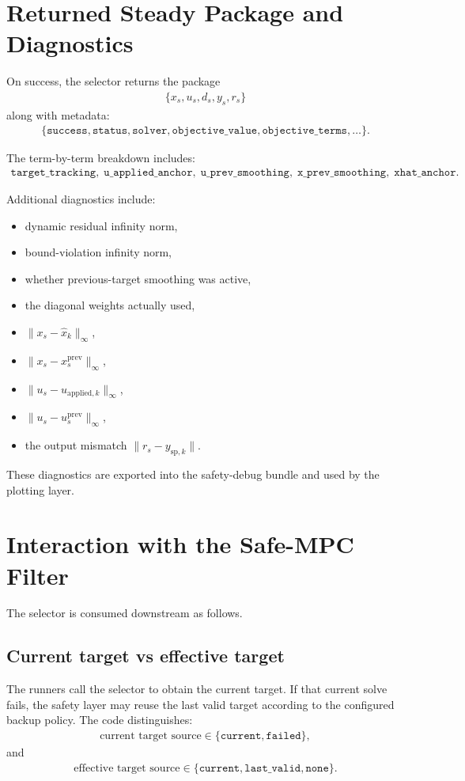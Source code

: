 \documentclass[11pt]{article}
\begin{document}
\section{Returned Steady Package and Diagnostics}
On success, the selector returns the package
\begin{align}
\{x_s,u_s,d_s,y_s,r_s\}
\end{align}
along with metadata:
\begin{align}
\{\texttt{success}, \texttt{status}, \texttt{solver}, \texttt{objective\_value}, \texttt{objective\_terms}, \ldots\}.
\end{align}

The term-by-term breakdown includes:
\begin{align}
\texttt{target\_tracking},\;
\texttt{u\_applied\_anchor},\;
\texttt{u\_prev\_smoothing},\;
\texttt{x\_prev\_smoothing},\;
\texttt{xhat\_anchor}.
\end{align}

Additional diagnostics include:
\begin{itemize}
\item dynamic residual infinity norm,
\item bound-violation infinity norm,
\item whether previous-target smoothing was active,
\item the diagonal weights actually used,
\item $\|x_s-\hat x_k\|_\infty$,
\item $\|x_s-x_s^{\mathrm{prev}}\|_\infty$,
\item $\|u_s-u_{\mathrm{applied},k}\|_\infty$,
\item $\|u_s-u_s^{\mathrm{prev}}\|_\infty$,
\item the output mismatch $\|r_s-y_{\mathrm{sp},k}\|$.
\end{itemize}

These diagnostics are exported into the safety-debug bundle and used by the plotting layer.

\section{Interaction with the Safe-MPC Filter}
The selector is consumed downstream as follows.

\subsection{Current target vs effective target}
The runners call the selector to obtain the current target. If that current solve fails, the safety layer may reuse the last valid target according to the configured backup policy. The code distinguishes:
\begin{align}
\text{current target source} \in \{\texttt{current},\texttt{failed}\},
\end{align}
and
\begin{align}
\text{effective target source} \in \{\texttt{current},\texttt{last\_valid},\texttt{none}\}.
\end{align}
\end{document}
